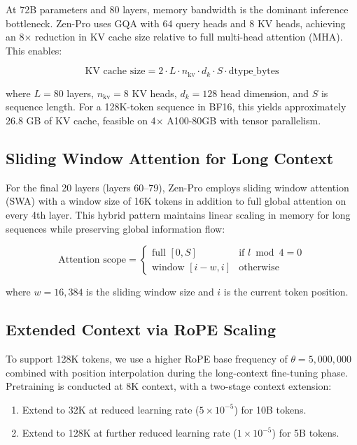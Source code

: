 \documentclass[11pt,a4paper]{article}
\begin{document}
At 72B parameters and 80 layers, memory bandwidth is the dominant inference bottleneck.
Zen-Pro uses GQA with 64 query heads and 8 KV heads, achieving an 8$\times$ reduction in
KV cache size relative to full multi-head attention (MHA). This enables:

\begin{equation}
  \text{KV cache size} = 2 \cdot L \cdot n_{\text{kv}} \cdot d_k \cdot S \cdot \text{dtype\_bytes}
\end{equation}

where $L=80$ layers, $n_{\text{kv}}=8$ KV heads, $d_k = 128$ head dimension, and $S$ is sequence
length. For a 128K-token sequence in BF16, this yields approximately 26.8 GB of KV cache,
feasible on 4$\times$ A100-80GB with tensor parallelism.

\subsection{Sliding Window Attention for Long Context}

For the final 20 layers (layers 60--79), Zen-Pro employs sliding window attention (SWA)
\cite{beltagy2020longformer} with a window size of 16K tokens in addition to full global
attention on every 4th layer. This hybrid pattern maintains linear scaling in memory for
long sequences while preserving global information flow:

\begin{equation}
  \text{Attention scope} =
  \begin{cases}
    \text{full }[0, S] & \text{if } l \bmod 4 = 0 \\
    \text{window }[i-w, i] & \text{otherwise}
  \end{cases}
\end{equation}

where $w = 16{,}384$ is the sliding window size and $i$ is the current token position.

\subsection{Extended Context via RoPE Scaling}

To support 128K tokens, we use a higher RoPE base frequency of $\theta = 5{,}000{,}000$ combined
with position interpolation during the long-context fine-tuning phase. Pretraining is conducted
at 8K context, with a two-stage context extension:

\begin{enumerate}
  \item Extend to 32K at reduced learning rate ($5 \times 10^{-5}$) for 10B tokens.
  \item Extend to 128K at further reduced learning rate ($1 \times 10^{-5}$) for 5B tokens.
\end{enumerate}
\end{document}
